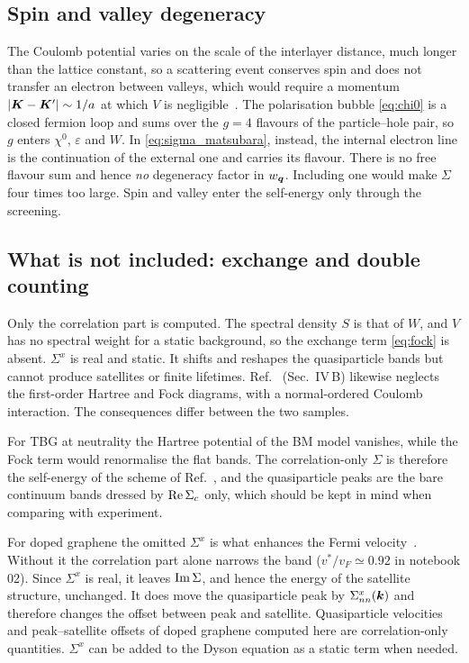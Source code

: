 \subsection{Spin and valley degeneracy}
\label{sec:degeneracy}

The Coulomb potential varies on the scale of the interlayer distance, much longer than the lattice constant, so a
scattering event conserves spin and does not transfer an electron between valleys, which would require a momentum
$|\bm K-\bm K'|\sim1/a$ at which $V$ is negligible~\cite{Kotov2012}. The polarisation bubble \eqref{eq:chi0} is a closed fermion
loop and sums over the $g=4$ flavours of the particle--hole pair, so $g$ enters $\chi^0$, $\varepsilon$ and $W$. In
\cref{eq:sigma_matsubara}, instead, the internal electron line is the continuation of the external one and carries its
flavour. There is no free flavour sum and hence \emph{no} degeneracy factor in $w_{\bm q}$. Including one would make
$\Sigma$ four times too large. Spin and valley enter the self-energy only through the screening.

\subsection{What is not included: exchange and double counting}
\label{sec:exchange}

Only the correlation part is computed. The spectral density $S$ is that of $W$, and $V$ has no spectral weight for a
static background, so the exchange term \eqref{eq:fock} is absent. $\Sigma^x$ is real and static. It shifts and reshapes
the quasiparticle bands but cannot produce satellites or finite lifetimes. Ref.~\cite{Wei2025} (Sec.~IV\,B) likewise
neglects the first-order Hartree and Fock diagrams, with a normal-ordered Coulomb interaction. The consequences differ
between the two samples.

For TBG at neutrality the Hartree potential of the BM model vanishes, while the Fock term would renormalise the flat
bands. The correlation-only $\Sigma$ is therefore the self-energy of the scheme of Ref.~\cite{Wei2025}, and the
quasiparticle peaks are the bare continuum bands dressed by $\operatorname{Re}\Sigma_c$ only, which should be kept in mind when
comparing with experiment.

For doped graphene the omitted $\Sigma^x$ is what enhances the Fermi velocity~\cite{Kotov2012,Elias2011}. Without it the
correlation part alone narrows the band ($v^*/v_F\simeq0.92$ in notebook 02). Since $\Sigma^x$ is real, it leaves
$\operatorname{Im}\Sigma$, and hence the energy of the satellite structure, unchanged. It does move the quasiparticle peak by
$\Sigma^x_{nn}(\bm k)$ and therefore changes the offset between peak and satellite. Quasiparticle velocities and
peak--satellite offsets of doped graphene computed here are correlation-only quantities. $\Sigma^x$ can be added to the
Dyson equation as a static term when needed.

